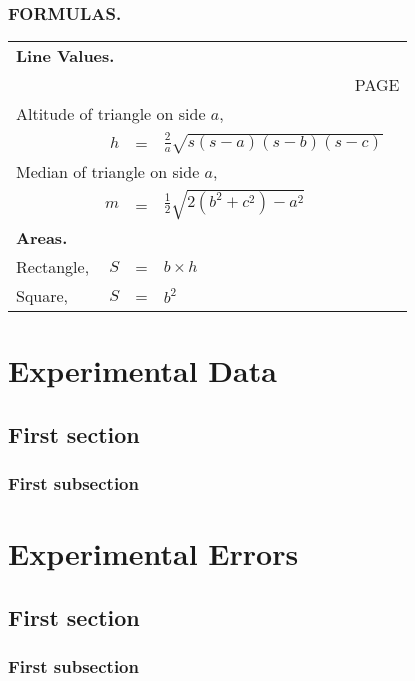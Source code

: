 \documentclass{book}
\begin{document}
\subsection{FORMULAS.}

\noindent\begin{longtable}{lr@{~}c@{~}l@{\qquad}r}
\multicolumn{5}{l}{\hspace{-2ex}\textbf{Line Values.}} \\
\multicolumn{5}{r}{\tiny PAGE}\\
\multicolumn{4}{l}{Altitude of triangle on side $a$,} \\
& $h$ &=& \( \displaystyle \frac{2}{a}
             \sqrt{s(s-a)(s-b)(s-c)} \) & \pageref{aref} \\
\multicolumn{4}{l}{Median of triangle on side $a$,} \\
& $m$ &=& \( \frac{1}{2} \sqrt{2(b^2+c^2) - a^2} \) & \pageref{aref} \\
\multicolumn{5}{l}{\hspace{-2ex}\textbf{Areas.}} \\
Rectangle,     & $S$ &=& $b\times h$ & \pageref{aref} \\
Square,        & $S$ &=& $b^2$ & \pageref{aref} \\
\end{longtable}


\appendix
\chapter{Experimental Data}
\section{First section}
\lipsum[1]
\subsection{First subsection}
\lipsum[1]
\chapter{Experimental Errors}
\section{First section}
\lipsum[1]
\subsection{First subsection}
\lipsum[1]
\end{document}
